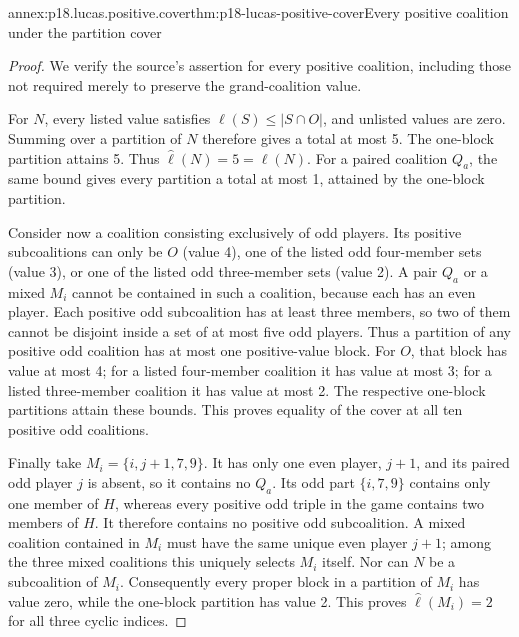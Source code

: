 \begin{annexitem}{annex:p18.lucas.positive.cover}{thm:p18-lucas-positive-cover}{Every positive coalition under the partition cover}
\begin{proof}
We verify the source's assertion for every positive
coalition, including those not required merely to
preserve the grand-coalition value.

For \(N\), every listed value satisfies
\(\ell(S)\leq|S\cap O|\), and unlisted values are zero.
Summing over a partition of \(N\) therefore gives a
total at most 5. The one-block partition attains 5.
Thus \(\widehat\ell(N)=5=\ell(N)\).
For a paired coalition \(Q_a\), the same bound gives
every partition a total at most 1, attained by the
one-block partition.

Consider now a coalition consisting exclusively of odd
players. Its positive subcoalitions can only be \(O\)
(value 4), one of the listed odd four-member sets
(value 3), or one of the listed odd three-member sets
(value 2). A pair \(Q_a\) or a mixed \(M_i\) cannot be
contained in such a coalition, because each has an even
player. Each positive odd subcoalition has at least
three members, so two of them cannot be disjoint inside
a set of at most five odd players. Thus a partition
of any positive odd coalition has at most one
positive-value block.
For \(O\), that block has value at most 4; for a listed
four-member coalition it has value at most 3; for a
listed three-member coalition it has value at most 2.
The respective one-block partitions attain these bounds.
This proves equality of the cover at all ten positive
odd coalitions.

Finally take \(M_i=\{i,j+1,7,9\}\).
It has only one even player, \(j+1\), and its paired
odd player \(j\) is absent, so it contains no \(Q_a\).
Its odd part \(\{i,7,9\}\) contains only one member of
\(H\), whereas every positive odd triple in the game
contains two members of \(H\). It therefore contains
no positive odd subcoalition. A mixed coalition
contained in \(M_i\) must have the same unique even
player \(j+1\); among the three mixed coalitions this
uniquely selects \(M_i\) itself. Nor can \(N\) be a
subcoalition of \(M_i\). Consequently every proper
block in a partition of \(M_i\) has value zero, while
the one-block partition has value 2. This proves
\(\widehat\ell(M_i)=2\) for all three cyclic indices.


\end{proof}
\end{annexitem}
